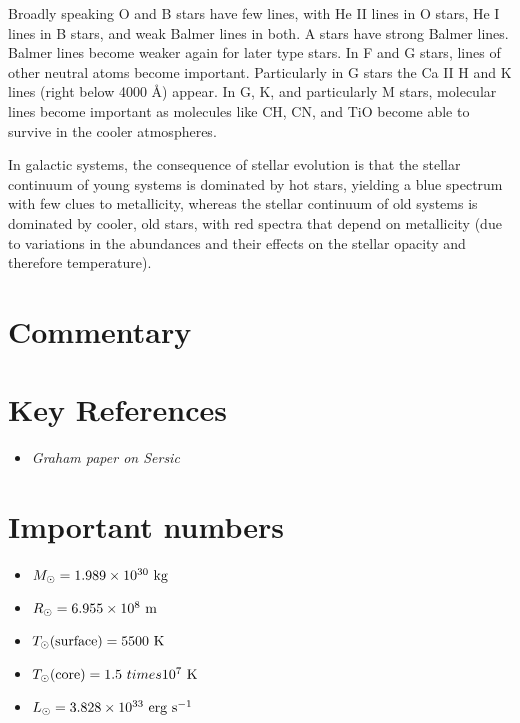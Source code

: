 Broadly speaking O and B stars have few lines, with He II lines in O
stars, He I lines in B stars, and weak Balmer lines in both. A stars
have strong Balmer lines. Balmer lines become weaker again for later
type stars. In F and G stars, lines of other neutral atoms become
important. Particularly in G stars the Ca II H and K lines (right
below 4000 \AA) appear. In G, K, and particularly M stars, molecular
lines become important as molecules like CH, CN, and TiO become able
to survive in the cooler atmospheres.

In galactic systems, the consequence of stellar evolution is that the
stellar continuum of young systems is dominated by hot stars, yielding
a blue spectrum with few clues to metallicity, whereas the stellar
continuum of old systems is dominated by cooler, old stars, with red
spectra that depend on metallicity (due to variations in the
abundances and their effects on the stellar opacity and therefore
temperature). 

\section{Commentary}

\section{Key References}

\begin{itemize}
  \item {\it Graham paper on Sersic}
\end{itemize}

\citet{gunn06a}

\section{Important numbers}

\begin{itemize}
\item $M_{\odot} = 1.989 \times 10^{30} {\rm ~kg} $
\item $R_{\odot} = 6.955 \times 10^{8} {\rm ~m} $
\item $T_{\odot}{\rm (surface)} = 5500 {\rm ~K} $
\item $T_{\odot}{\rm (core)} = 1.5 \ times 10^7 {\rm ~K} $
\item $L_{\odot} = 3.828 \times 10^{33} {\rm ~erg} {\rm ~s}^{-1}$
\end{itemize}

